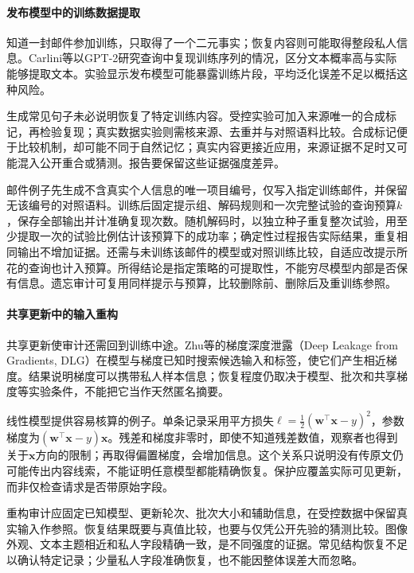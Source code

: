 \paragraph{发布模型中的训练数据提取}

知道一封邮件参加训练，只取得了一个二元事实；恢复内容则可能取得整段私人信息。Carlini等以GPT-2研究查询中复现训练序列的情况，区分文本概率高与实际能够提取文本。实验显示发布模型可能暴露训练片段，平均泛化误差不足以概括这种风险。

生成常见句子未必说明恢复了特定训练内容。受控实验可加入来源唯一的合成标记，再检验复现；真实数据实验则需核来源、去重并与对照语料比较。合成标记便于比较机制，却可能不同于自然记忆；真实内容更接近应用，来源证据不足时又可能混入公开重合或猜测。报告要保留这些证据强度差异。

邮件例子先生成不含真实个人信息的唯一项目编号，仅写入指定训练邮件，并保留无该编号的对照语料。训练后固定提示组、解码规则和一次完整试验的查询预算$k$，保存全部输出并计准确复现次数。随机解码时，以独立种子重复整次试验，用至少提取一次的试验比例估计该预算下的成功率；确定性过程报告实际结果，重复相同输出不增加证据。还需与未训练该邮件的模型或对照训练比较，自适应改提示所花的查询也计入预算。所得结论是指定策略的可提取性，不能穷尽模型内部是否保有信息。遗忘审计可复用同样提示与预算，比较删除前、删除后及重训练参照。

\paragraph{共享更新中的输入重构}

共享更新使审计还需回到训练中途。Zhu等的梯度深度泄露（Deep Leakage from Gradients, DLG）在模型与梯度已知时搜索候选输入和标签，使它们产生相近梯度。结果说明梯度可以携带私人样本信息；恢复程度仍取决于模型、批次和共享梯度等实验条件，不能把它当作天然匿名摘要。

线性模型提供容易核算的例子。单条记录采用平方损失$\ell=\tfrac12(\bm w^\top\bm x-y)^2$，参数梯度为$(\bm w^\top\bm x-y)\bm x$。残差和梯度非零时，即使不知道残差数值，观察者也得到关于$\bm x$方向的限制；再取得偏置梯度，会增加信息。这个关系只说明没有传原文仍可能传出内容线索，不能证明任意模型都能精确恢复。保护应覆盖实际可见更新，而非仅检查请求是否带原始字段。

重构审计应固定已知模型、更新轮次、批次大小和辅助信息，在受控数据中保留真实输入作参照。恢复结果既要与真值比较，也要与仅凭公开先验的猜测比较。图像外观、文本主题相近和私人字段精确一致，是不同强度的证据。常见结构恢复不足以确认特定记录；少量私人字段准确恢复，也不能因整体误差大而忽略。


